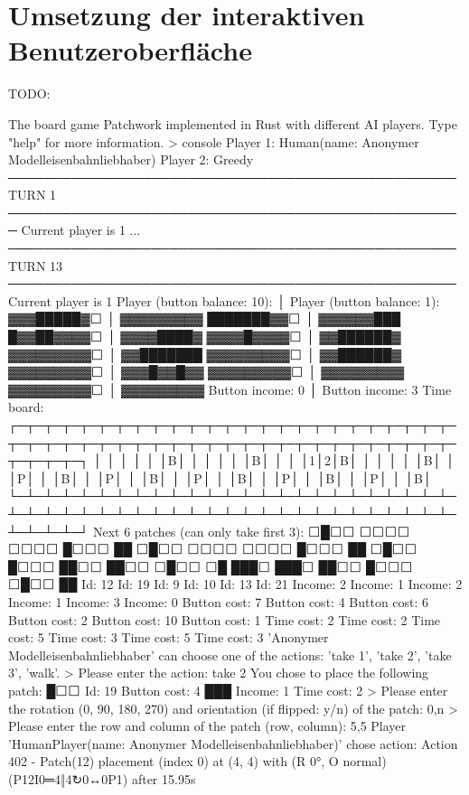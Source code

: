 \chapter{Umsetzung der interaktiven Benutzeroberfläche}
\label{chapter:umsetzung-der-interaktiven-benutzeroberfläche}

TODO:

{\color{white}
\begin{myverbbox}{\patchworkCLI}
The board game Patchwork implemented in Rust with different AI players. Type "help" for more information.
> console
Player 1: Human(name: Anonymer Modelleisenbahnliebhaber)
Player 2: Greedy
────────────────────────────────────────────────── TURN 1 ───────────────────────────────────────────────────
Current player is 1
...
────────────────────────────────────────────────── TURN 13 ──────────────────────────────────────────────────
Current player is 1
Player (button balance: 10): │ Player (button balance: 1):
  ▓▓▓█████▓⬜  │   ▓▓▓▓▓▓▓▓▓
  ███████▓▓⬜  │   ▓▓▓▓▓▓███
  █▓▓██▓▓▓▓⬜  │   ▓▓▓▓████▓
  ▓▓▓▓█▓▓▓▓⬜  │   ▓▓██████▓
  ▓▓▓▓▓▓▓▓▓⬜  │   ▓▓███████
  ▓▓▓▓▓▓▓▓▓⬜  │   ▓▓██████▓
  ▓▓▓▓▓▓▓▓▓⬜  │   ▓▓▓█▓▓█▓▓
  ▓▓▓▓▓▓▓▓▓⬜  │   ▓▓▓▓▓▓▓▓▓
  ▓▓▓▓▓▓▓▓▓⬜  │   ▓▓▓▓▓▓▓▓▓
      Button income: 0       │      Button income: 3
Time board:
┌─┬─┬─┬─┬─┬─┬─┬─┬─┬─┬─┬─┬─┬─┬─┬─┬─┬─┬─┬─┬─┬─┬─┬─┬─┬─┬─┬─┬─┬─┬─┬─┬─┬─┬─┬─┬─┬─┬─┬─┬─┬─┬─┬─┬─┬─┬─┬─┬─┬─┬─┬─┬─┬─┐
│ │ │ │ │ │B│ │ │ │ │ │B│ │ │ │1│2│B│ │ │ │ │ │B│ │ │P│ │ │B│ │ │P│ │ │B│ │ │P│ │ │B│ │ │P│ │ │B│ │ │P│ │ │B│
└─┴─┴─┴─┴─┴─┴─┴─┴─┴─┴─┴─┴─┴─┴─┴─┴─┴─┴─┴─┴─┴─┴─┴─┴─┴─┴─┴─┴─┴─┴─┴─┴─┴─┴─┴─┴─┴─┴─┴─┴─┴─┴─┴─┴─┴─┴─┴─┴─┴─┴─┴─┴─┴─┘
Next 6 patches (can only take first 3):
⬜█⬜⬜        ⬜⬜⬜⬜        ⬜⬜⬜⬜        █⬜⬜⬜        ██
⬜█⬜⬜        ⬜⬜⬜⬜        ⬜⬜⬜⬜        █⬜⬜⬜        ██
⬜█⬜⬜        █⬜⬜⬜        ██⬜⬜        ██⬜⬜        ⬜█⬜⬜         ⬜█
███⬜        ███⬜        ██⬜⬜        █⬜⬜⬜        ⬜█⬜⬜         ██
Id: 12            Id: 19            Id: 9             Id: 10            Id: 13             Id: 21
Income: 2         Income: 1         Income: 2         Income: 1         Income: 3          Income: 0
Button cost: 7    Button cost: 4    Button cost: 6    Button cost: 2    Button cost: 10    Button cost: 1
Time cost: 2      Time cost: 2      Time cost: 5      Time cost: 3      Time cost: 5       Time cost: 3
'Anonymer Modelleisenbahnliebhaber' can choose one of the actions: 'take 1', 'take 2', 'take 3', 'walk'.
> Please enter the action: take 2
You chose to place the following patch:
   █⬜⬜   Id: 19       Button cost: 4
   ███   Income: 1    Time cost: 2
> Please enter the  rotation (0, 90, 180, 270) and orientation (if flipped: y/n) of the patch: 0,n
> Please enter the row and column of the patch (row, column): 5,5
Player 'HumanPlayer(name: Anonymer Modelleisenbahnliebhaber)' chose action:
Action 402 - Patch(12) placement (index 0) at (4, 4) with (R 0°, O normal) (P12I0═4‖4↻0↔0P1) after 15.95s
\end{myverbbox}
}

